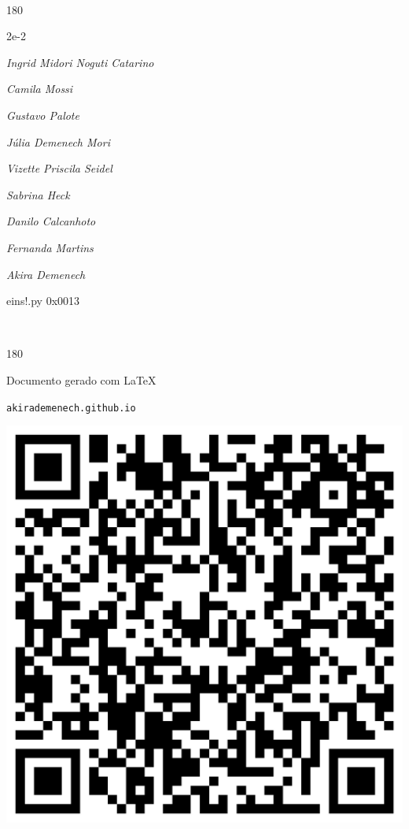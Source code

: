 \documentclass[12pt]{article}
\begin{document}
	\ 
	\vfill
	\begin{turn}{180}	
		\begin{minipage}{\textwidth}
		  	\ttfamily %
			\centering
			{\Huge 2e-2}
		  
			\hfill
		  
			

\textit{\small Ingrid Midori Noguti Catarino}

\textit{\small Camila Mossi}

\textit{\small Gustavo Palote}

\textit{\small Júlia Demenech Mori}

\textit{\small Vizette Priscila Seidel}

\textit{\small Sabrina Heck}

\textit{\small Danilo Calcanhoto}

\textit{\small Fernanda Martins}

\textit{\small Akira Demenech}

\bigskip

eins!.py
0x0013


		\end{minipage}	
	\end{turn}
	\vfill
	\

\pagebreak

	\begin{turn}{180}	
		\begin{minipage}{\textwidth}		  
		  Documento gerado com \LaTeX			
		  
		  \texttt{akirademenech.github.io}

		  \includegraphics[height=0.3\textheight]{2e-2.pdf}

		\end{minipage}	
	\end{turn}  
		  
\end{document}
